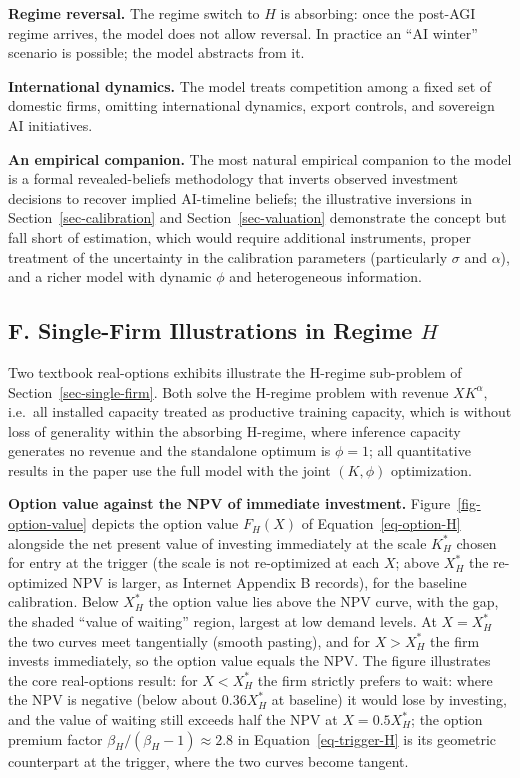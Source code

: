 \documentclass[
  11pt,
  letterpaper,
]{scrartcl}
\begin{document}
\textbf{Regime reversal.} The regime switch to \(H\) is absorbing: once
the post-AGI regime arrives, the model does not allow reversal. In
practice an ``AI winter'' scenario is possible; the model abstracts from
it.

\textbf{International dynamics.} The model treats competition among a
fixed set of domestic firms, omitting international dynamics, export
controls, and sovereign AI initiatives.

\textbf{An empirical companion.} The most natural empirical companion to
the model is a formal revealed-beliefs methodology that inverts observed
investment decisions to recover implied AI-timeline beliefs; the
illustrative inversions in Section~\ref{sec-calibration} and
Section~\ref{sec-valuation} demonstrate the concept but fall short of
estimation, which would require additional instruments, proper treatment
of the uncertainty in the calibration parameters (particularly
\(\sigma\) and \(\alpha\)), and a richer model with dynamic \(\phi\) and
heterogeneous information.

\newpage

\subsection*{\texorpdfstring{F. Single-Firm Illustrations in Regime
\(H\)}{F. Single-Firm Illustrations in Regime H}}\label{f.-single-firm-illustrations-in-regime-h}

Two textbook real-options exhibits illustrate the H-regime sub-problem
of Section~\ref{sec-single-firm}. Both solve the H-regime problem with
revenue \(X K^\alpha\), i.e.~all installed capacity treated as
productive training capacity, which is without loss of generality within
the absorbing H-regime, where inference capacity generates no revenue
and the standalone optimum is \(\phi = 1\); all quantitative results in
the paper use the full model with the joint \((K, \phi)\) optimization.

\textbf{Option value against the NPV of immediate investment.}
Figure~\ref{fig-option-value} depicts the option value \(F_H(X)\) of
Equation~\ref{eq-option-H} alongside the net present value of investing
immediately at the scale \(K_H^*\) chosen for entry at the trigger (the
scale is not re-optimized at each \(X\); above \(X_H^*\) the
re-optimized NPV is larger, as Internet Appendix B records), for the
baseline calibration. Below \(X_H^*\) the option value lies above the
NPV curve, with the gap, the shaded ``value of waiting'' region, largest
at low demand levels. At \(X = X_H^*\) the two curves meet tangentially
(smooth pasting), and for \(X > X_H^*\) the firm invests immediately, so
the option value equals the NPV. The figure illustrates the core
real-options result: for \(X < X_H^*\) the firm strictly prefers to
wait: where the NPV is negative (below about \(0.36 X_H^*\) at baseline)
it would lose by investing, and the value of waiting still exceeds half
the NPV at \(X = 0.5 X_H^*\); the option premium factor
\(\beta_H/(\beta_H - 1) \approx 2.8\) in Equation~\ref{eq-trigger-H} is
its geometric counterpart at the trigger, where the two curves become
tangent.
\end{document}

